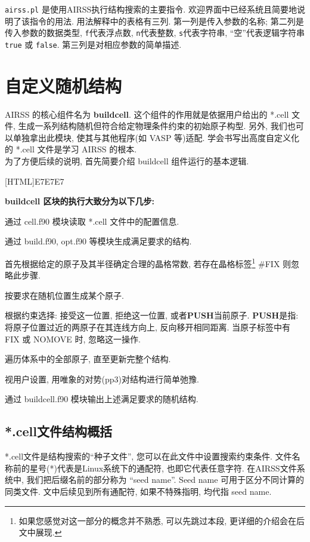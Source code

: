 \documentclass[a4paper, 10pt]{article}
\begin{document}
\verb|airss.pl| 是使用AIRSS执行结构搜索的主要指令. 欢迎界面中已经系统且简要地说明了该指令的用法. 用法解释中的表格有三列. 第一列是传入参数的名称; 第二列是传入参数的数据类型, \verb|f|代表浮点数, \verb|n|代表整数, \verb|s|代表字符串, ``空''代表逻辑字符串 \verb!true! 或 \verb!false!. 第三列是对相应参数的简单描述.

\newpage
\section{自定义随机结构}
AIRSS 的核心组件名为 \textbf{buildcell}. 这个组件的作用就是依据用户给出的 *.cell 文件, 生成一系列结构随机但符合给定物理条件约束的初始原子构型. 另外, 我们也可以单独拿出此模块, 使其与其他程序(如 VASP 等)适配. 学会书写出高度自定义化的 *.cell 文件是学习 AIRSS 的根本.\\

为了方便后续的说明, 首先简要介绍 buildcell 组件运行的基本逻辑. 

\noindent{}[HTML]{E7E7E7}{\parbox{\textwidth}{%
\noindent \textbf{buildcell 区块的执行大致分为以下几步:}
\begin{maineu}
\item 通过 cell.f90 模块读取 *.cell 文件中的配置信息.
\item 通过 build.f90, opt.f90 等模块生成满足要求的结构. 
  \begin{subeu}
    \item 首先根据给定的原子及其半径确定合理的晶格常数, 若存在晶格标签\footnote{如果您感觉对这一部分的概念并不熟悉, 可以先跳过本段, 更详细的介绍会在后文中展现.} \#FIX 则忽略此步骤.
    \item 按要求在随机位置生成某个原子.
    \item 根据约束选择: 接受这一位置, 拒绝这一位置, 或者\textbf{PUSH}当前原子. \textbf{PUSH}是指: 将原子位置过近的两原子在其连线方向上, 反向移开相同距离. 当原子标签中有 FIX 或 NOMOVE 时, 忽略这一操作.
    \item 遍历体系中的全部原子, 直至更新完整个结构.
    \item 视用户设置, 用唯象的对势(pp3)对结构进行简单弛豫.
  \end{subeu}
\item 通过 buildcell.f90 模块输出上述满足要求的随机结构.
\end{maineu}}}

\subsection{*.cell文件结构概括}
*.cell文件是结构搜索的``种子文件'', 您可以在此文件中设置搜索约束条件. 文件名称前的星号(*)代表是Linux系统下的通配符, 也即它代表任意字符. 在AIRSS文件系统中, 我们把后缀名前的部分称为 ``seed name''. Seed name 可用于区分不同计算的同类文件. 文中后续见到所有通配符, 如果不特殊指明, 均代指 seed name.
\end{document}
